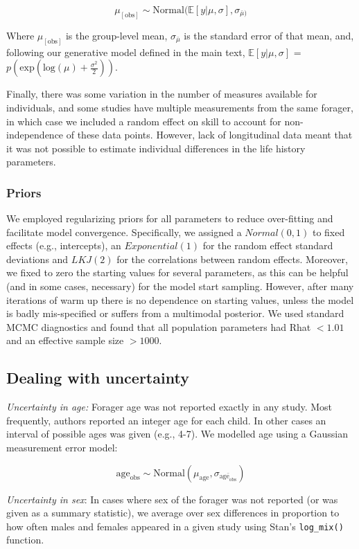 $$ \mu_{[\textrm{obs}]} \sim \textrm{Normal}(\mathbb{E}[y|\mu,\sigma], \sigma_{\bar{\mu})} $$

Where $\mu_{[\textrm{obs}]}$ is the group-level mean, $\sigma_{\bar{\mu}}$ is the standard error of that mean, and, following our generative model defined in the main text, $\mathbb{E}[y|\mu,\sigma]$ = $p(\textrm{exp}( \textrm{log}(\mu) + \frac{\sigma^2}{2})) $.

Finally, there was some variation in the number of measures available for individuals, and some studies have multiple measurements from the same forager, in which case we included a random effect on skill to account for non-independence of these data points. However, lack of longitudinal data meant that it was not possible to estimate individual differences in the life history parameters.

\subsubsection{Priors}
We employed regularizing priors for all parameters to reduce over-fitting and facilitate model convergence. Specifically, we assigned a $Normal(0,1)$ to fixed effects (e.g., intercepts), an $Exponential(1)$ for the random effect standard deviations and $LKJ(2)$ for the correlations between random effects. Moreover, we fixed to zero the starting values for several parameters, as this can be helpful (and in some cases, necessary) for the model start sampling. However, after many iterations of warm up there is no dependence on starting values, unless the model is badly mis-specified or suffers from a multimodal posterior. We used standard MCMC diagnostics and found that all population parameters had Rhat $< 1.01$ and an effective sample size $> 1000$.


\subsection{Dealing with uncertainty }

\emph{Uncertainty in age:} Forager age was not reported exactly in any study. Most frequently, authors reported an integer age for each child. In other cases an interval of possible ages was given (e.g., 4-7). We modelled age using a Gaussian measurement error model:

$$ \textrm{age}_{\textrm{obs}} \sim \textrm{Normal}(\mu_{\textrm{age}}, \sigma_{\bar{\textrm{age}_{\textrm{obs}}}}) $$

\emph{Uncertainty in sex}: In cases where sex of the forager was not reported (or was given as a summary statistic), we average over sex differences in proportion to how often males and females appeared in a given study using Stan's \texttt{log\_mix()} function.



